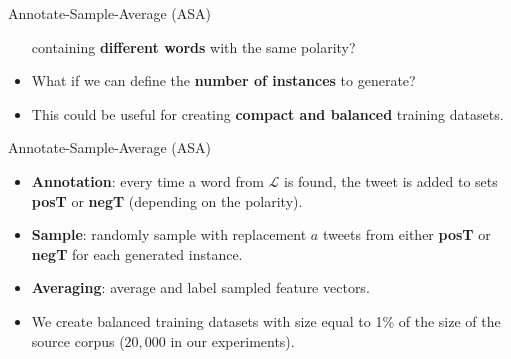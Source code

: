 \documentclass[handout]{beamer}
\begin{document}
\begin{frame}{Annotate-Sample-Average (ASA)}
\begin{scriptsize}
\begin{itemize}
containing \textbf{different words} with the same polarity?
 \item What if we can define the \textbf{number of instances} to generate?
 \item This could be useful for creating \textbf{compact and balanced} training datasets. 
 
 \end{itemize}
 
  
 
\end{scriptsize} 
\end{frame}

\begin{frame}{Annotate-Sample-Average (ASA)}
\begin{scriptsize}
 \begin{itemize}
 \item \textbf{Annotation}: every time a word from $\mathcal{L}$  is found, the  tweet is added to sets \textbf{posT} or \textbf{negT} (depending on the polarity).
 \item \textbf{Sample}: randomly sample with replacement $a$ tweets from either \textbf{posT} or \textbf{negT} for each generated instance. 
 \item \textbf{Averaging}: average and label sampled feature vectors.
 \item We create balanced training datasets with size equal to 1\% of the size of the source corpus ($20,000$ in our experiments).
 \end{itemize}
  
\end{scriptsize} 
\end{frame}
\end{document}
